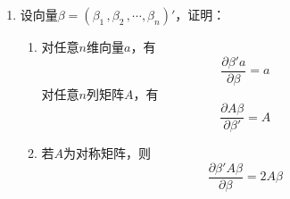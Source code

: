 \documentclass[10pt]{article}
\theoremstyle{definition}
\theoremstyle{definition}
\begin{document}
\begin{enumerate}
\begin{proof}
            记$y=(y_1\, ,\cdots ,y_n)'$，$\Lambda=\mathrm{diag}(\lambda_1\, ,\cdots ,\lambda_n)$，则
            \begin{equation*}
                y'\Lambda y=\lambda_1y_1^2+\cdots +\lambda_ny_n^2
            \end{equation*}
            令$f(y)=\lambda_1y_1^2+\cdots +\lambda_ny_n^2$，于是问题转化为求解
            \begin{equation*}
                \begin{aligned}
        & \max_{y}f(y) \qquad \mathrm{s.t.} \ \sum_{i=1}^{n}y_i^2=1 \\
        & \min_{y}f(y) \qquad \mathrm{s.t.} \ \sum_{i=1}^{n}y_i^2=1
                \end{aligned}
            \end{equation*}
            应用拉格朗日乘数法，构造拉格朗日函数
            \begin{equation*}
                L(y\, ,\mu)= \lambda_1y_1^2+\cdots +\lambda_ny_n^2-\mu(y_1^2+\cdots +y_n^2-1)
            \end{equation*}
            上式两端对各分量求一阶偏导，得
            \begin{equation*}
                \begin{aligned}
        & \frac{\partial L}{\partial y_i}=2\lambda_iy_i-2\mu y_i=0 \qquad i=1\, ,2\, ,\cdots ,n \\
        & \frac{\partial L}{\partial \mu}=y_1^2+\cdots +y_n^2-1=0
                \end{aligned}
            \end{equation*}
            解得$\mu=\lambda_i \, ,y=\epsilon_i\, ,f(\epsilon_i)=\lambda_i$，其中$\epsilon_i$为第$i$个分量为1，其余分量为0的单位向量。
            由此，遍历$A$的特征值，知结论成立。
        \end{proof}

    \item 	%
        设向量$\beta=(\beta_1\, ,\beta_2\, ,\cdots ,\beta_n)'$，证明：

        \begin{enumerate}[label=(\roman*)]
            \item
                对任意$n$维向量$a$，有
                \begin{equation*}
                    \frac{\partial \beta' a}{\partial \beta}=a
                \end{equation*}
                对任意$n$列矩阵$A$，有
                \begin{equation*}
                    \frac{\partial A\beta}{\partial \beta'}=A
                \end{equation*}
            \item
                若$A$为对称矩阵，则
                \begin{equation*}
                    \frac{\partial \beta' A\beta}{\partial \beta}=2A\beta
                \end{equation*}
        \end{enumerate}


\end{enumerate}
\end{document}
